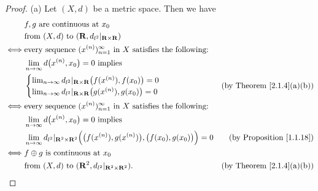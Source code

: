 \begin{proof}{(a)}
    Let \((X, d)\) be a metric space.
    Then we have
    \begin{align*}
             & f, g \text{ are continuous at } x_0                                                                                                                                             \\
             & \text{from } (X, d) \text{ to } (\mathbf{R}, d_{l^2}|_{\mathbf{R} \times \mathbf{R}})                                                                                           \\
        \iff & \text{every sequence } (x^{(n)})_{n = 1}^\infty \text{ in } X \text{ satisfies the following:}                                                                                  \\
             & \lim_{n \to \infty} d\big(x^{(n)}, x_0\big) = 0 \text{ implies }                                                                                                                \\
             & \begin{cases}
            \lim_{n \to \infty} d_{l^2}|_{\mathbf{R} \times \mathbf{R}}\big(f(x^{(n)}), f(x_0)\big) = 0 \\
            \lim_{n \to \infty} d_{l^2}|_{\mathbf{R} \times \mathbf{R}}\big(g(x^{(n)}), g(x_0)\big) = 0
        \end{cases}                                                                                                               & \text{(by Theorem \ref{2.1.4}(a)(b))} \\
        \iff & \text{every sequence } (x^{(n)})_{n = 1}^\infty \text{ in } X \text{ satisfies the following:}                                                                                  \\
             & \lim_{n \to \infty} d\big(x^{(n)}, x_0\big) = 0 \text{ implies }                                                                                                                \\
             & \lim_{n \to \infty} d_{l^2}|_{\mathbf{R}^2 \times \mathbf{R}^2}\Big(\big(f(x^{(n)}), g(x^{(n)})\big), \big(f(x_0), g(x_0)\big)\Big) = 0 & \text{(by Proposition \ref{1.1.18})}  \\
        \iff & f \oplus g \text{ is continuous at } x_0                                                                                                                                        \\
             & \text{from } (X, d) \text{ to } (\mathbf{R}^2, d_{l^2}|_{\mathbf{R}^2 \times \mathbf{R}^2}).                                            & \text{(by Theorem \ref{2.1.4}(a)(b))}
    \end{align*}
\end{proof}

